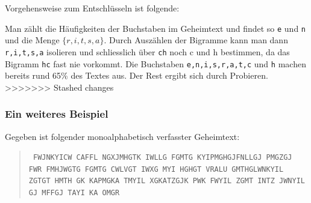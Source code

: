 \documentclass[%
<<<<<<< Updated upstream
11pt,%
twoside,%
titlepage,%
german,%
headsepline%
]{scrartcl}
\begin{document}
Vorgehensweise zum Entschlüsseln ist folgende:

Man zählt die Häufigkeiten der Buchstaben im Geheimtext und findet so \texttt{e} und \texttt{n} und die Menge $\{r,i,t,s,a\}$. Durch Auszählen der Bigramme kann man dann \texttt{r,i,t,s,a} isolieren und schliesslich über \texttt{ch} noch c und h bestimmen, da das Bigramm \texttt{hc} fast nie vorkommt. Die Buchstaben \texttt{e,n,i,s,r,a,t,c} und \texttt{h} machen bereits rund 65\% des Textes aus. Der Rest ergibt sich durch Probieren.
>>>>>>> Stashed changes

\subsubsection{Ein weiteres Beispiel}

Gegeben ist folgender monoalphabetisch verfasster Geheimtext:
\begin{quote}
\noindent
\texttt{
FWJNKYICW CAFFL NGXJMHGTK IWLLG FGMTG KYIPMGHGJFNLLGJ PMGZGJ FWR FMHJWGTG FGMTG CWLVGT IWXG MYI HGHGT VRALU GMTHGLWNKYIL ZGTGT HMTH GK KAPMGKA TMYIL XGKATZGJK PWK FWYIL ZGMT INTZ JWNYIL GJ MFFGJ TAYI KA OMGR
\normalfont
}
\end{quote}
\end{document}
